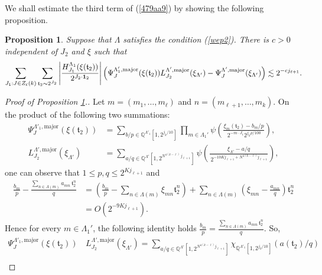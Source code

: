 \documentclass[11 pt,letterpaper]{amsart}
\theoremstyle{plain}
\newtheorem{proposition}{Proposition}\numberwithin{proposition}{section}
\theoremstyle{definition}
\theoremstyle{remark} \theoremstyle{exam} \theoremstyle{ob}
\numberwithin{equation}{section}
\begin{document}
We shall estimate the third term of (\ref{479aa9}) by showing the following proposition. 
\begin{proposition}\label{prop8139}
Suppose that $\Lambda$ satisfies   the  condition (\ref{wep2}). There  is $c>0$  independent of $J_2$ and $\xi$ such that
\begin{align*}
 \sum_{J_1: J\in Z_\ell(k)} \sum_{\mathfrak{t}_2\sim 2^{J_2}} \left|\frac{H^{\Lambda_{1}}_{J_1}( \xi(\mathfrak{t}_2)) }{2^{J_2\cdot {\bf 1}_2} }\right|  \left(\Psi_{J}^{\Lambda'_1,\mathrm{major}}(\xi(\mathfrak{t}_2)) L^{\Lambda',\rm{major}}_{J_2}(\xi_{\Lambda'})-\Psi^{\Lambda',\rm{major}}_{J}(\xi_{\Lambda'})  \right) \lesssim 2^{-cj_{\ell+1}}.
\end{align*}
\end{proposition}
 
\begin{proof}[Proof of Proposition \ref{prop8139}.]
Let $m=(m_1,\dots,m_{\ell})$ and $n=(m_{\ell+1},\dots,m_k)$.  
On the product of the following two summations:
\begin{align*}
\Psi_{J}^{\Lambda'_1,\mathrm{major}}\!\left(\xi(\mathfrak{t}_2)\right)
&= 
\sum_{b/p \in \mathbb{Q}^{\Lambda'_1}[1, 2^{j_k/10}]}  
\prod_{m\in \Lambda_{1}'}
\psi\!\left(
\frac{\xi_{m}(\mathfrak{t}_2)-b_{m}/p}{\,2^{-m\cdot J_1} 2^{j_k\rho/100}}
\right), \\
L^{\Lambda',\mathrm{major}}_{J_2}(\xi_{\Lambda'})
&=
\sum_{a/q \in \mathbb{Q}^{\Lambda'}[1,2^{N^{4(k-\ell)}\,j_{\ell+1}}]}
\psi\!\left(
\frac{\xi_{\Lambda'}-a/q}{\,2^{-10K j_{\ell+1} + N^{4(k-\ell)} j_{\ell+1}}}
\right),
\end{align*}
one can observe  that
 $1 \le p,q \le 2^{K j_{\ell+1}}$  and
\begin{align*}
\frac{b_{m}}{p}
- \frac{\sum_{n\in \Lambda(m)} a_{mn}\,\mathfrak{t}_2^{n}}{q} 
&=
\left(
\frac{b_{m}}{p}
-
\sum_{n\in \Lambda(m)} \xi_{mn}\mathfrak{t}_2^{n}
\right)
+
\sum_{n\in \Lambda(m)}
\left(\xi_{mn}-\frac{a_{mn}}{q}\right)\mathfrak{t}_2^{n}  \\
&= O(2^{-9K j_{\ell+1}}).
\end{align*}
Hence for every \(m \in \Lambda_1'\), the following identity holds
$
\frac{b_m}{p}
=
\frac{\sum_{n\in \Lambda(m)} a_{mn}\,\mathfrak{t}_2^{n}}{q}.
$
So,  
\begin{align*}
\Psi_{J}^{\Lambda'_1,\mathrm{major}}\!\left(\xi(\mathfrak{t}_2)\right)
\, &L^{\Lambda',\mathrm{major}}_{J_2}(\xi_{\Lambda'})=\sum_{a/q \in \mathbb{Q}^{\Lambda'}[1,2^{N^{4(k-\ell)}j_{\ell+1}}]}    \chi_{ \mathbb{Q}^{\Lambda'_1}[1, 2^{j_k/10}]  }(a(\mathfrak{t}_2)/q)\\

\end{align*}
\end{proof}
\end{document}
